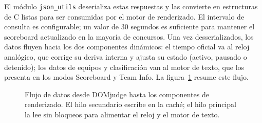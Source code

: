 El módulo \texttt{json\_utils} deserializa estas respuestas y las convierte en estructuras de C
listas para ser consumidas por el motor de renderizado. El intervalo de consulta es configurable;
un valor de 30 segundos es suficiente para mantener el scoreboard actualizado en la mayoría de
concursos. Una vez desserializados, los datos fluyen hacia los dos componentes dinámicos: el
tiempo oficial va al reloj analógico, que corrige su deriva interna y ajusta su estado (activo,
pausado o detenido); los datos de equipos y clasificación van al motor de texto, que los
presenta en los modos Scoreboard y Team Info. La figura~\ref{fig:flujo_datos} resume este flujo.
 
\begin{figure}[H]
\centering
{}
\caption{Flujo de datos desde DOMjudge hasta los componentes de renderizado. El hilo secundario
escribe en la caché; el hilo principal la lee sin bloqueos para alimentar el reloj y el motor
de texto.}
\label{fig:flujo_datos}
\end{figure}
 
